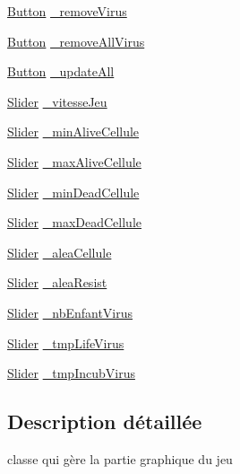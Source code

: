 \begin{DoxyCompactItemize}
\item 
\hyperlink{classButton}{Button} \hyperlink{classMenuView_a0bd235fdfcd954c55a4c5f473fc929de}{\_\-removeVirus}
\item 
\hyperlink{classButton}{Button} \hyperlink{classMenuView_a1e49e44405b91c463eeff0019b1e822a}{\_\-removeAllVirus}
\item 
\hyperlink{classButton}{Button} \hyperlink{classMenuView_a516ac9fa81f55e155e791e7289beef7e}{\_\-updateAll}
\item 
\hyperlink{classSlider}{Slider} \hyperlink{classMenuView_a459ca483b65ce8e5b8de24413d332f92}{\_\-vitesseJeu}
\item 
\hyperlink{classSlider}{Slider} \hyperlink{classMenuView_a49bd867e05c9f948edade72c9946a5aa}{\_\-minAliveCellule}
\item 
\hyperlink{classSlider}{Slider} \hyperlink{classMenuView_ac8ba89797373b1287c86737c1155b54e}{\_\-maxAliveCellule}
\item 
\hyperlink{classSlider}{Slider} \hyperlink{classMenuView_a908ee4bed6feebc980dd326aa94a686c}{\_\-minDeadCellule}
\item 
\hyperlink{classSlider}{Slider} \hyperlink{classMenuView_a0a2dddc686d39245959c810388b39707}{\_\-maxDeadCellule}
\item 
\hyperlink{classSlider}{Slider} \hyperlink{classMenuView_a7e2350d2ec096544eecb1e6b64406746}{\_\-aleaCellule}
\item 
\hyperlink{classSlider}{Slider} \hyperlink{classMenuView_a8d4eb64d57530f53e0a67639bf6daee0}{\_\-aleaResist}
\item 
\hyperlink{classSlider}{Slider} \hyperlink{classMenuView_a20a271062852d0a99d8867aff64c1283}{\_\-nbEnfantVirus}
\item 
\hyperlink{classSlider}{Slider} \hyperlink{classMenuView_a5ffd50183f18befa3939aa95a94582f1}{\_\-tmpLifeVirus}
\item 
\hyperlink{classSlider}{Slider} \hyperlink{classMenuView_a6a8e198f883ccc85a9e2920975e975b7}{\_\-tmpIncubVirus}
\end{DoxyCompactItemize}


\subsection{Description détaillée}
classe qui gère la partie graphique du jeu 

